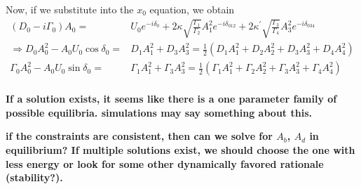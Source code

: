 Now, if we substitute into the $x_0$ equation, we obtain
\begin{subequations}
\begin{align}
(D_0 - i \Gamma_0) A_0 = & U_0 e^{-i\delta_0} + 2\kappa\sqrt{\frac{\Gamma_1}{\Gamma_2}}A_1^2 e^{-i\delta_{012}} + 2\kappa^\prime\sqrt{\frac{\Gamma_3}{\Gamma_4}}A_3^2 e^{-i\delta_{034}} \\
\Rightarrow D_0 A_0^2 - A_0 U_0 \cos\delta_0 = & D_1 A_1^2 + D_3 A_3^2 = \frac{1}{2}\left(D_1 A_1^2 + D_2 A_2^2 + D_3 A_3^2 + D_4 A_4^2\right) \\
\Gamma_0 A_0^2 - A_0 U_0 \sin\delta_0 = & \Gamma_1 A_1^2 + \Gamma_3 A_3^2 = \frac{1}{2}\left(\Gamma_1 A_1^2 + \Gamma_2 A_2^2 + \Gamma_3 A_3^2 + \Gamma_4 A_4^2 \right) \\
\end{align}
\end{subequations}

\textbf{If a solution exists, it seems like there is a one parameter family of possible equilibria. simulations may say something about this.}

\textbf{if the constraints are consistent, then can we solve for $A_b$, $A_d$ in equilibrium? If multiple solutions exist, we should choose the one with less energy or look for some other dynamically favored rationale (stability?).}


